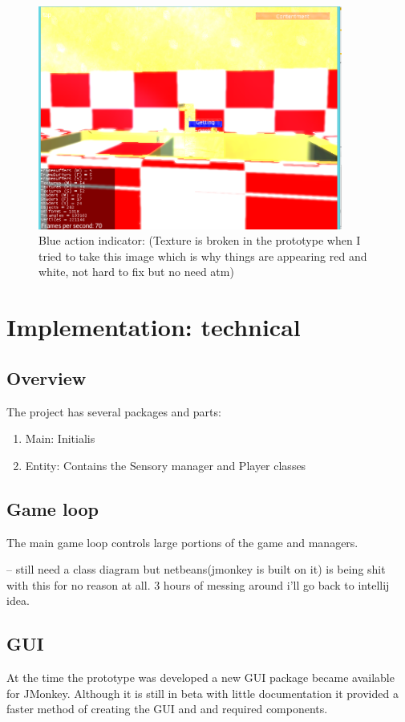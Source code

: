 \documentclass[11pt]{report}
\begin{document}
\begin{figure}[H]
\centering
\includegraphics[width=100mm]{images/prototype/actionindicator.png}
\caption{Blue action indicator: (Texture is broken in the prototype when I tried to take this image which is why things are appearing red and white, not hard to fix but no need atm)}
\label{prototype_actionindicator}
\end{figure}

\section{Implementation: technical}
\subsection{Overview}
The project has several packages and parts:
\begin{enumerate}
\item Main: Initialis
\item Entity: Contains the Sensory manager and Player classes
\end{enumerate}

\subsection{Game loop}
The main game loop controls large portions of the game and managers. 

-- still need a class diagram but netbeans(jmonkey is built on it) is being shit with this for no reason at all. 3 hours of messing around i'll go back to intellij idea. 
\subsection{GUI}
At the time the prototype was developed a new GUI package became available for JMonkey. Although it is still in beta with little documentation it provided a faster method of creating the GUI and and required components. 
\end{document}
